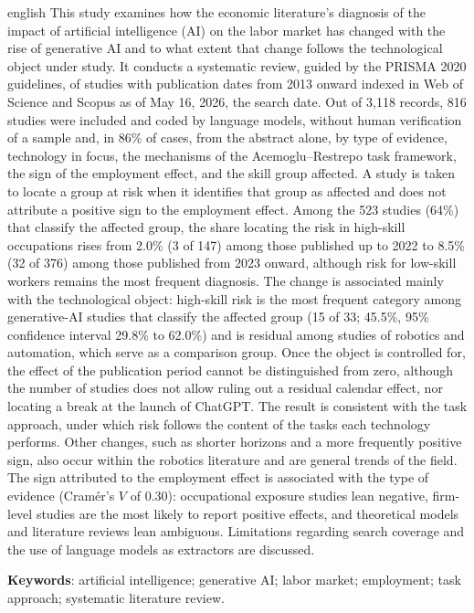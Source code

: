 \begin{resumo}[ABSTRACT]
\begin{otherlanguage*}{english}\SingleSpacing
This study examines how the economic literature's diagnosis of the impact of artificial intelligence (AI) on the labor market has changed with the rise of generative AI and to what extent that change follows the technological object under study. It conducts a systematic review, guided by the PRISMA 2020 guidelines, of studies with publication dates from 2013 onward indexed in Web of Science and Scopus as of May 16, 2026, the search date. Out of 3,118 records, 816 studies were included and coded by language models, without human verification of a sample and, in 86\% of cases, from the abstract alone, by type of evidence, technology in focus, the mechanisms of the Acemoglu--Restrepo task framework, the sign of the employment effect, and the skill group affected. A study is taken to locate a group at risk when it identifies that group as affected and does not attribute a positive sign to the employment effect. Among the 523 studies (64\%) that classify the affected group, the share locating the risk in high-skill occupations rises from 2.0\% (3 of 147) among those published up to 2022 to 8.5\% (32 of 376) among those published from 2023 onward, although risk for low-skill workers remains the most frequent diagnosis. The change is associated mainly with the technological object: high-skill risk is the most frequent category among generative-AI studies that classify the affected group (15 of 33; 45.5\%, 95\% confidence interval 29.8\% to 62.0\%) and is residual among studies of robotics and automation, which serve as a comparison group. Once the object is controlled for, the effect of the publication period cannot be distinguished from zero, although the number of studies does not allow ruling out a residual calendar effect, nor locating a break at the launch of ChatGPT. The result is consistent with the task approach, under which risk follows the content of the tasks each technology performs. Other changes, such as shorter horizons and a more frequently positive sign, also occur within the robotics literature and are general trends of the field. The sign attributed to the employment effect is associated with the type of evidence (Cramér's $V$ of 0.30): occupational exposure studies lean negative, firm-level studies are the most likely to report positive effects, and theoretical models and literature reviews lean ambiguous. Limitations regarding search coverage and the use of language models as extractors are discussed.

\noindent
\textbf{Keywords}: artificial intelligence; generative AI; labor market; employment; task approach; systematic literature review.
\end{otherlanguage*}
\end{resumo}
